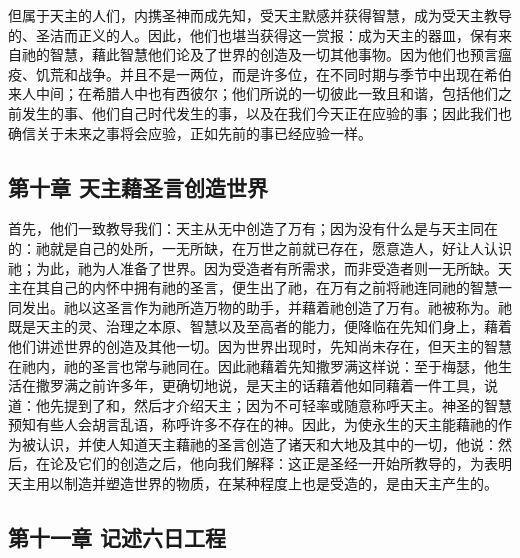 但属于天主的人们，内携圣神而成先知，受天主默感并获得智慧，成为受天主教导的、圣洁而正义的人。因此，他们也堪当获得这一赏报：成为天主的器皿，保有来自祂的智慧，藉此智慧他们论及了世界的创造及一切其他事物。因为他们也预言瘟疫、饥荒和战争。并且不是一两位，而是许多位，在不同时期与季节中出现在希伯来人中间；在希腊人中也有西彼尔；他们所说的一切彼此一致且和谐，包括他们之前发生的事、他们自己时代发生的事，以及在我们今天正在应验的事；因此我们也确信关于未来之事将会应验，正如先前的事已经应验一样。\par


\subsection{第十章 天主藉圣言创造世界}

首先，他们一致教导我们：天主从无中创造了万有；因为没有什么是与天主同在的：祂就是自己的处所，一无所缺，在万世之前就已存在，愿意造人，好让人认识祂；为此，祂为人准备了世界。因为受造者有所需求，而非受造者则一无所缺。天主在其自己的内怀中拥有祂的圣言，便生出了祂，在万有之前将祂连同祂的智慧一同发出。祂以这圣言作为祂所造万物的助手，并藉着祂创造了万有。祂被称为。祂既是天主的灵、治理之本原、智慧以及至高者的能力，便降临在先知们身上，藉着他们讲述世界的创造及其他一切。因为世界出现时，先知尚未存在，但天主的智慧在祂内，祂的圣言也常与祂同在。因此祂藉着先知撒罗满这样说：至于梅瑟，他生活在撒罗满之前许多年，更确切地说，是天主的话藉着他如同藉着一件工具，说道：他先提到了和，然后才介绍天主；因为不可轻率或随意称呼天主。神圣的智慧预知有些人会胡言乱语，称呼许多不存在的神。因此，为使永生的天主能藉祂的作为被认识，并使人知道天主藉祂的圣言创造了诸天和大地及其中的一切，他说：然后，在论及它们的创造之后，他向我们解释：这正是圣经一开始所教导的，为表明天主用以制造并塑造世界的物质，在某种程度上也是受造的，是由天主产生的。\par


\subsection{第十一章 记述六日工程}

